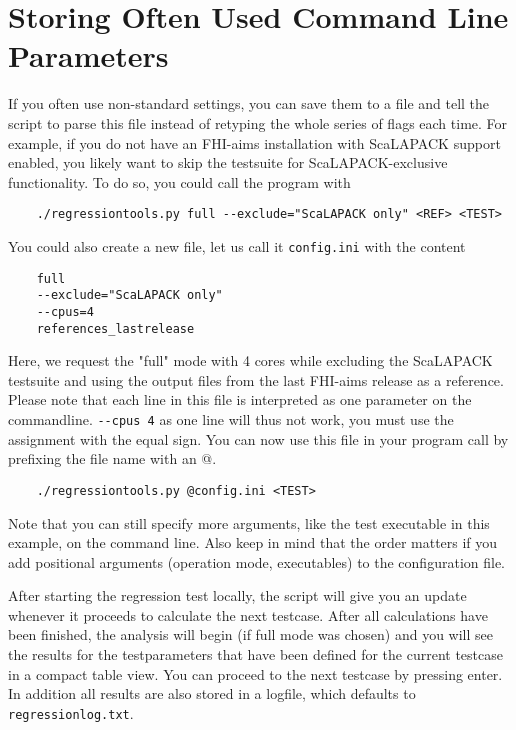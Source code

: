 \documentclass[a4paper,12pt]{scrartcl}
\begin{document}
\section{Storing Often Used Command Line Parameters}
If you often use non-standard settings, you can save them to a file and tell the script to parse this file instead of
retyping the whole series of flags each time. For example, if you do not have an FHI-aims installation with ScaLAPACK
support enabled, you likely want to skip the testsuite for ScaLAPACK-exclusive functionality. To do so, you could
call the program with
\begin{verbatim}
    ./regressiontools.py full --exclude="ScaLAPACK only" <REF> <TEST>
\end{verbatim}
You could also create a new file, let us call it \texttt{config.ini} with the content
\begin{verbatim}
    full
    --exclude="ScaLAPACK only"
    --cpus=4
    references_lastrelease
\end{verbatim}
Here, we request the "full" mode with 4 cores while excluding the ScaLAPACK testsuite and using the output files from
the last FHI-aims release as a reference.
Please note that each line in this file is interpreted as one parameter on the commandline.
\verb|--cpus 4| as one line will thus not work, you must use the assignment with the equal sign. You can now use this
file in your program call by prefixing the file name with an @.
\begin{verbatim}
    ./regressiontools.py @config.ini <TEST>
\end{verbatim}
Note that you can still specify more arguments, like the test executable in this example, on the command line. Also
keep in mind that the order matters if you add positional arguments (operation mode, executables) to the
configuration file.

After starting the regression test locally, the script will give you an update whenever it proceeds to calculate the
next testcase. After all calculations have been finished, the analysis will begin (if full mode was chosen) and you
will see the results for the testparameters that have been defined for the current testcase in a compact table view.
You can proceed to the next testcase by pressing enter. In addition all results are also stored in a logfile, which
defaults to \texttt{regressionlog.txt}.
\end{document}
